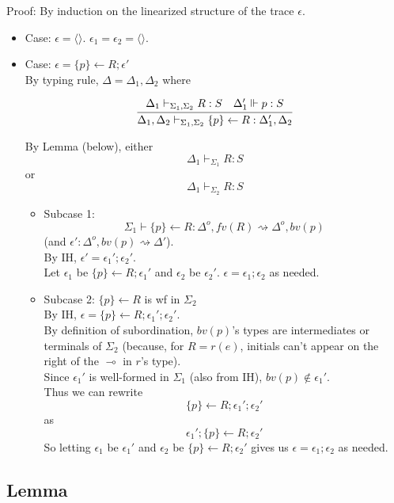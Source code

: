 \documentclass{article}
\newcommand{\lolli}{\multimap}
\newcommand{\stepsto}{\rightsquigarrow}
\newcommand{\eps}{\epsilon}
\newcommand{\nileps}{\langle\rangle}
\begin{document}
Proof: By induction on the linearized structure of the trace $\eps$.

\begin{itemize}
\item Case: $\eps = \nileps$. $\eps_1 = \eps_2 = \nileps$. \checkmark
\item Case: $\eps = \{p\}\gets R; \eps'$\\

  By typing rule, $\Delta = \Delta_1, \Delta_2$ where

  \[
  \infer
  { \Delta_1, \Delta_2 \vdash_{\Sigma_1,\Sigma_2} \{p\} \gets R : \Delta_1', \Delta_2 }
  { \Delta_1 \vdash_{\Sigma_1,\Sigma_2} R : S
  &
  \Delta_1' \Vdash p : S
  }
  \]

  By Lemma (below), either 
  \[ \Delta_1 \vdash_{\Sigma_1} R : S \]
  or
  \[ \Delta_1 \vdash_{\Sigma_2} R : S \]
  \begin{itemize}
  \item Subcase 1: 
    \[
      \Sigma_1 \vdash \{p\}\gets R 
        : \Delta^{o}, fv(R) \stepsto \Delta^{o}, bv(p)
    \]
    (and $\eps' : \Delta^o, bv(p) \stepsto \Delta'$).\\
    By IH, $\eps' = \eps_1'; \eps_2'$.\\
    Let $\eps_1$ be $\{p\} \gets R; \eps_1'$ and
    $\eps_2$ be $\eps_2'$. $\eps =\eps_1;\eps_2$ as needed.
  \item Subcase 2: $\{p\}\gets R$ is wf in $\Sigma_2$\\
    By IH, $\eps = \{p\}\gets R; \eps_1'; \eps_2'$.\\
    By definition of subordination, $bv(p)$'s types are intermediates or
    terminals of $\Sigma_2$ (because, for $R = r(e)$, initials can't appear
    on the right of the $\lolli$ in $r$'s type).\\
    Since $\eps_1'$ is well-formed in $\Sigma_1$ (also from IH),
    $bv(p) \notin \eps_1'$.\\
    Thus we can rewrite
    \[ \{p\}\gets R; \eps_1'; \eps_2' \]
    as
    \[ \eps_1'; \{p\}\gets R; \eps_2' \]
    So letting $\eps_1$ be $\eps_1'$ and $\eps_2$ be $\{p\}\gets R;
    \eps_2'$ gives us $\eps =\eps_1;\eps_2$ as needed.
  \end{itemize}
\end{itemize}

\subsection{Lemma}
\end{document}

